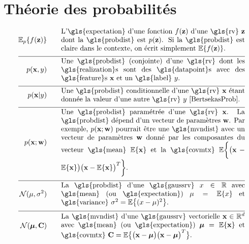 \section*{Théorie des probabilités} 
\begin{align}
	\expect_{p} \{ f(\datapoint) \}  \quad\quad & \parbox{.75\textwidth}{L'\gls{expectation} d'une fonction $f(\datapoint)$ d'une \gls{rv} 
		$\datapoint$ dont la \gls{probdist} est $\prob{\datapoint}$. Si la \gls{probdist} est claire dans le contexte, 
		on écrit simplement $\expect \{ f(\datapoint) \}$. }  \nonumber \\[2mm] \hline \nonumber\\[-5mm]    
	\prob{\featurevec,\truelabel} \quad\quad & \parbox{.75\textwidth}{Une \gls{probdist} (conjointe) d'une \gls{rv} 
		dont les \gls{realization}s sont des \gls{datapoint}s avec des \gls{feature}s $\featurevec$ et un \gls{label} $\truelabel$.} \nonumber        \nonumber \\[2mm] \hline \nonumber\\[-5mm]        
	\prob{\featurevec|\truelabel} \quad\quad & \parbox{.75\textwidth}{Une \gls{probdist} conditionnelle d'une \gls{rv} 
		$\featurevec$ étant donnée la valeur d'une autre \gls{rv} $\truelabel$ \cite[Sec.\ 3.5]{BertsekasProb}. } \nonumber       \nonumber \\[2mm] \hline \nonumber\\[-5mm]           
	\prob{\featurevec;\weights} \quad\quad & \parbox{.75\textwidth}{Une \gls{probdist} paramétrée d'une \gls{rv} $\featurevec$. 
		La \gls{probdist} dépend d'un vecteur de paramètres $\weights$. Par exemple, $\prob{\featurevec;\weights}$ pourrait être une 
		\gls{mvndist} avec un vecteur de paramètres $\weights$ donné par les composantes du vecteur \gls{mean} $\expect \{ \featurevec \}$ 
		et la \gls{covmtx} $\expect \bigg \{ \big( \featurevec - \expect \{ \featurevec \}\big) \big( \featurevec - \expect \{ \featurevec \}\big)^{T}  \bigg\}$.} \nonumber           \nonumber \\[2mm] \hline \nonumber\\[-5mm]
	\mathcal{N}(\mu, \sigma^{2}) \quad\quad & \parbox{.75\textwidth}{La \gls{probdist} d'une 
		\gls{gaussrv} $\feature \in \mathbb{R}$ avec \gls{mean} (ou \gls{expectation}) $\mu= \expect \{ \feature \}$ 
		et \gls{variance} $\sigma^{2} =   \expect \big\{  (  \feature - \mu )^2 \big\}$.} \nonumber    \nonumber \\[2mm] \hline \nonumber\\[-5mm]
	\mathcal{N}(\clustermean, \mathbf{C}) \quad\quad & \parbox{.75\textwidth}{La \gls{mvndist} d'une \gls{gaussrv} vectorielle 
		$\featurevec \in \mathbb{R}^{\featuredim}$ avec \gls{mean} (ou \gls{expectation}) $\clustermean= \expect \{ \featurevec \}$ 
		et \gls{covmtx} $\mathbf{C} =  \expect \big\{ \big( \featurevec - \clustermean \big)\big( \featurevec - \clustermean \big)^{T} \big\}$.} \nonumber                                             
\end{align}






